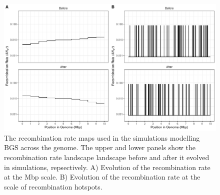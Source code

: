 \documentclass[11pt,twoside, onecolumn]{GSA_format}
\begin{document}
\begin{figure}[h]
\includegraphics[width=\textwidth]{../Plots/recombinationMapDiagram.pdf}
\caption{The recombination rate maps used in the simulations modelling BGS across the genome. The upper and lower panels show the recombination rate landscape landscape before and after it evolved in simulations, repsectively. A) Evolution of the recombination rate at the Mbp scale. B) Evolution of the recombination rate at the scale of recombination hotspots.}
\label{fig:recombinationRateMaps}
\end{figure}
\end{document}
